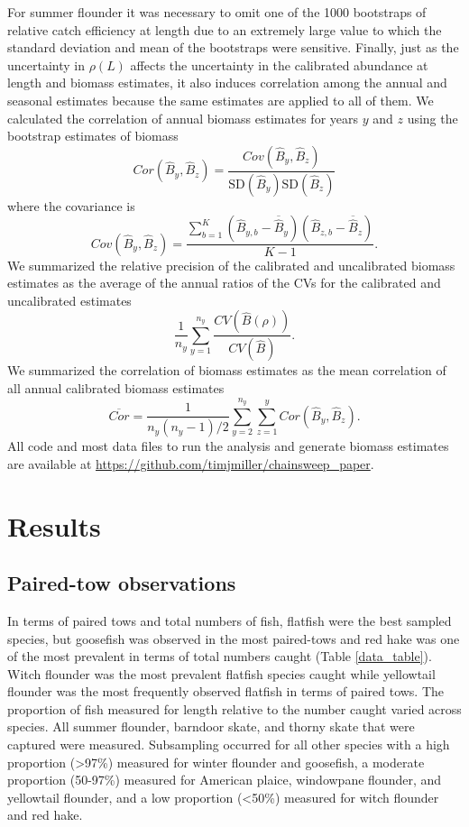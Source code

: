 \documentclass[
  12pt,
]{article}
\begin{document}
For summer flounder it was necessary to omit one of the 1000 bootstraps
of relative catch efficiency at length due to an extremely large value
to which the standard deviation and mean of the bootstraps were
sensitive. Finally, just as the uncertainty in \(\rho\left(L\right)\)
affects the uncertainty in the calibrated abundance at length and
biomass estimates, it also induces correlation among the annual and
seasonal estimates because the same estimates are applied to all of
them. We calculated the correlation of annual biomass estimates for
years \(y\) and \(z\) using the bootstrap estimates of biomass \[
Cor\left(\widehat B_y, \widehat B_z\right) = \frac{Cov\left(\widehat B_y, \widehat B_z\right)}{\text{SD}\left(\widehat B_y\right)\text{SD}\left(\widehat B_z\right)}
\] where the covariance is \[
Cov\left(\widehat B_y, \widehat B_z\right) = \frac{\sum_{b=1}^K \left(\widehat B_{y,b} - \overline{\widehat B}_y\right)\left(\widehat B_{z,b} - \overline{\widehat B}_z\right)}{K-1}.
\] We summarized the relative precision of the calibrated and
uncalibrated biomass estimates as the average of the annual ratios of
the CVs for the calibrated and uncalibrated estimates \[
\frac{1}{n_y} \sum^{n_y}_{y = 1}\frac{CV\left(\widehat B\left(\rho\right)\right)}{CV\left(\widehat B\right)}.
\] We summarized the correlation of biomass estimates as the mean
correlation of all annual calibrated biomass estimates \[
\overline {Cor} = \frac{1}{n_y(n_y-1)/2} \sum_{y=2}^{n_y} \sum_{z=1}^{y} Cor\left(\widehat B_y, \widehat B_z\right).
\] All code and most data files to run the analysis and generate biomass
estimates are available at
\url{https://github.com/timjmiller/chainsweep_paper}.

\hypertarget{results}{%
\section{Results}\label{results}}

\hypertarget{paired-tow-observations}{%
\subsection{Paired-tow observations}\label{paired-tow-observations}}

In terms of paired tows and total numbers of fish, flatfish were the
best sampled species, but goosefish was observed in the most paired-tows
and red hake was one of the most prevalent in terms of total numbers
caught (Table \ref{data_table}). Witch flounder was the most prevalent
flatfish species caught while yellowtail flounder was the most
frequently observed flatfish in terms of paired tows. The proportion of
fish measured for length relative to the number caught varied across
species. All summer flounder, barndoor skate, and thorny skate that were
captured were measured. Subsampling occurred for all other species with
a high proportion (\textgreater97\%) measured for winter flounder and
goosefish, a moderate proportion (50-97\%) measured for American plaice,
windowpane flounder, and yellowtail flounder, and a low proportion
(\textless50\%) measured for witch flounder and red hake.
\end{document}
